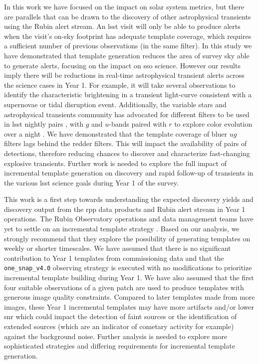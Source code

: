 \documentclass[preprintm,linenumbers]{aastex631}
\newcommand{\baseline}{\texttt{one\_snap\_v4.0}\xspace}
\begin{document}
		In this work we have focused on the impact on solar system metrics, but there are parallels that can be drawn to the discovery of other astrophysical transients using the Rubin alert stream. 
  An \gls*{lsst} visit will only be able to produce alerts when the visit's on-sky footprint has adequate template coverage, which requires a sufficient number of previous observations (in the same filter).
  In this study we have demonstrated that template generation reduces the area of survey sky able to generate alerts, %
  focusing on the impact on \gls*{sso} science.
  However our results imply there will be reductions in real-time astrophysical transient alerts across the science cases in Year 1.
  For example, it will take several observations to identify the characteristic brightening in a transient light-curve consistent with a supernovae or tidal disruption event. 
  Additionally, the variable stars and astrophysical transients community has advocated for different filters to be used in \gls*{lsst} nightly pairs \citep{2019PASPpresto}, with $g$ and $u$-bands paired with $r$ to explore color evolution over a night \citep{SCOC_Report_1, SCOC_Report_2}. 
  We have demonstrated that the template coverage of bluer $ug$ filters lags behind the redder filters.
  This will impact the availability of pairs of detections, therefore reducing chances to discover and characterize fast-changing explosive transients. 
  Further work is needed to explore the full impact of incremental template generation on discovery and rapid follow-up of transients in the various \gls*{lsst} science goals during Year 1 of the survey. 
		
		This work is a first step towards understanding the expected discovery yields and discovery output from the \gls*{rpp} data products and Rubin alert stream in Year 1 operations. 
		The Rubin Observatory operations and data management teams have yet to settle on an incremental template strategy \citep{DMTN-107,RTN-011}. 
		Based on our analysis, we strongly recommend that they explore the possibility of generating templates on weekly or shorter timescales.  
		We have assumed that there is no significant contribution to Year 1 templates from commissioning data and that the \baseline observing strategy is executed with no modifications to prioritize incremental template building during Year 1. 
  We have also assumed that the first four suitable observations of a given patch are used to produce templates with generous image quality constraints. 
  Compared to later templates made from more images, these Year 1 incremental templates may have more artifacts and/or lower \gls*{snr} which could impact the detection of faint sources or the identification of extended sources (which are an indicator of cometary activity for example) against the background noise.
		Further analysis is needed to explore more sophisticated strategies and differing requirements for incremental template generation. 
        
\end{document}
